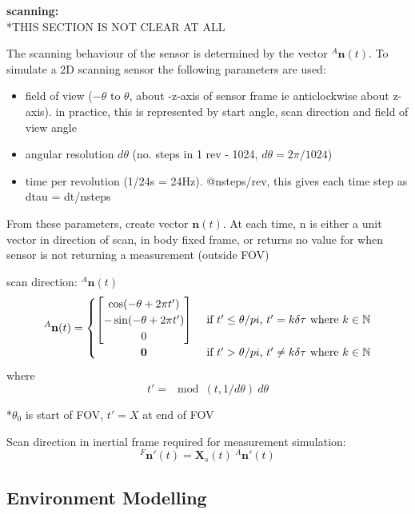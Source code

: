 \textbf{scanning:}\\
*THIS SECTION IS NOT CLEAR AT ALL

The scanning behaviour of the sensor is determined by the vector ${^{A}\mathbf{n}(t)}$.
To simulate a 2D scanning sensor the following parameters are used:
\begin{itemize}
\item field of view ($-\theta$ to $\theta$, about -z-axis of sensor frame ie anticlockwise about z-axis). in practice, this is represented by start angle, scan direction and field of view angle
\item angular resolution $d\theta$ (no. steps in 1 rev - 1024, $d\theta = 2\pi/1024$)
\item time per revolution (1/24s = 24Hz). @nsteps/rev, this gives each time step as dtau = dt/nsteps
\end{itemize}
From these parameters, create vector $\mathbf{n}(t)$. At each time, n is either a unit vector in direction of scan, in body fixed frame, or returns no value for when sensor is not returning a measurement (outside FOV)

scan direction: $^{A}\mathbf{n}(t)$
\begin{equation}
^{A}\mathbf{n}(t) =
	\begin{cases} 
	      \hfill \begin{bmatrix}
	      		\cos(-\theta + 2\pi t') \\
	      		-\sin(-\theta + 2\pi t') \\
	      		0
	      	\end{bmatrix}    \hfill & \text{ if $t' \leq \theta/pi$, $t' = k\delta\tau$ where $k \in \mathbb{N}$} \\
	      \hfill \mathbf{0} \hfill & \text{ if $t' > \theta/pi$, $t' \neq k\delta\tau$ where $k \in \mathbb{N}$} \\
	\end{cases} 
\end{equation}
where
\begin{equation}
t' = \mod(t,1/d\theta)\:d\theta
\end{equation}

*$\theta_0$ is start of FOV, $t'=X$ at end of FOV

Scan direction in inertial frame required for measurement simulation:
\begin{equation}
	{^{F}\mathbf{n'}(t)} = \mathbf{X}_s(t)\:{^{A}\mathbf{n'}(t)}
\end{equation}

\subsection{Environment Modelling}

